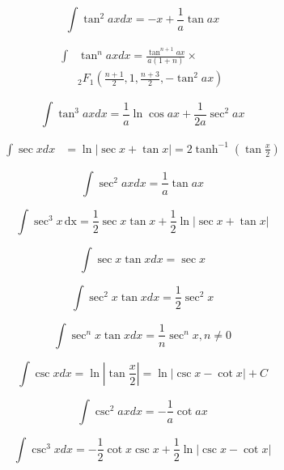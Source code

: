 \documentclass[11pt,twoside]{article}
\begin{document}
\begin{multicols}{3}
\begin{footnotesize}
\begin{equation}
\int \tan^2 ax dx = -x + \frac{1}{a} \tan ax
\end{equation}

\begin{align}
\int &\tan^n ax dx =
\frac{\tan^{n+1} ax }{a(1+n)} \times \nonumber \\ &
 {_2}F_1\left( \frac{n+1}{2},
1, \frac{n+3}{2}, -\tan^2 ax \right)
\end{align}

\begin{equation}
\int \tan^3 ax dx = \frac{1}{a} \ln \cos ax + \frac{1}{2a}\sec^2 ax
\end{equation}

\begin{align}
\int \sec x dx &= \ln | \sec x + \tan x | = 2 \tanh^{-1} \left (\tan \frac{x}{2} \right)
\end{align}

\begin{equation}
\int \sec^2 ax dx = \frac{1}{a} \tan ax
\end{equation}

\begin{equation}
\int \sec^3 x \hspace{2pt}\text{dx} = \frac{1}{2} \sec x \tan x + \frac{1}{2}\ln | \sec x + \tan x |
\end{equation}

\begin{equation}
\int \sec x \tan x dx = \sec x
\end{equation}

\begin{equation}
\int \sec^2 x \tan x dx = \frac{1}{2} \sec^2 x
\end{equation}

\begin{equation}
\int \sec^n x \tan x dx = \frac{1}{n} \sec^n x , n\ne 0
\end{equation}

\begin{equation}
\int \csc x dx = \ln \left | \tan \frac{x}{2} \right|  = \ln | \csc x - \cot x| + C
\end{equation}

\begin{equation}
\int \csc^2 ax dx = -\frac{1}{a} \cot ax
\end{equation}

\begin{equation}
\int \csc^3 x dx = -\frac{1}{2}\cot x \csc x + \frac{1}{2} \ln | \csc x - \cot x |
\end{equation}


\end{footnotesize}
\end{multicols}
\end{document}
